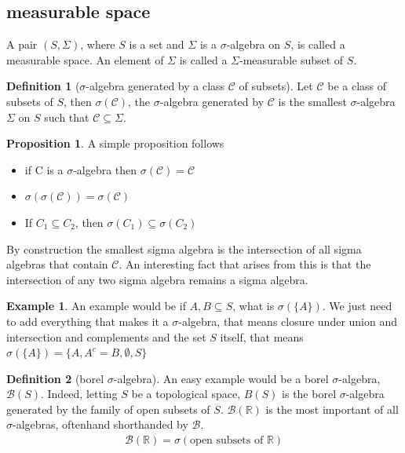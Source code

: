 \documentclass[12pt]{article}
\theoremstyle{definition}
\newtheorem{definition}{Definition}[section]
\newtheorem{proposition}{Proposition}[theorem]
\newtheorem{example}{Example}[section]
\begin{document}
\subsection{measurable space}
A pair $(S, \Sigma)$, where $S$ is a set and $\Sigma$ is a $\sigma$-algebra on $S$, is called a measurable space. An element of $\Sigma$ is called a $\Sigma$-measurable subset of $S$. 
\begin{definition}[$\sigma$-algebra generated by a class $\mathcal{C}$ of subsets]
	Let $\mathcal{C}$ be a class of subsets of $S$, then $\sigma(\mathcal{C})$, the $\sigma$-algebra generated by $\mathcal{C}$ is the smallest $\sigma$-algebra $\Sigma$ on $S$ such that $\mathcal{C} \subseteq \Sigma$. 
	
\end{definition}
\begin{proposition}
	A simple proposition follows 
	\begin{itemize}
		\item if C is a $\sigma$-algebra then $\sigma(\mathcal{C}) = \mathcal{C}$ 
		\item $\sigma(\sigma(\mathcal{C})) = \sigma(\mathcal{C})$
		\item If $C_1 \subseteq C_2$, then $\sigma(C_1) \subseteq \sigma(C_2)$
	\end{itemize}
\end{proposition}
By construction the smallest sigma algebra is the intersection of all sigma algebras that contain $\mathcal{C}$. An interesting fact that arises from this is that the intersection of any two sigma algebra remains a sigma algebra. 
\begin{example}
	An example would be if $A, B \subseteq S$, what is $\sigma(\{A\})$. We just need to add everything that makes it a $\sigma$-algebra, that means closure under union and intersection and complements and the set $S$ itself, that means $\sigma(\{A\}) = \{ A, A^c = B	, \emptyset, S\}$
\end{example}
\begin{definition}[borel $\sigma$-algebra]
	

An easy example would be a borel $\sigma$-algebra, $\mathcal{B}(S)$. Indeed, letting $S$ be a topological space, $B(S)$ is the borel $\sigma$-algebra generated by the family of open subsets of $S$. $\mathcal{B}(\mathbb{R})$ is the most important of all $\sigma$-algebras, oftenhand shorthanded by $\mathcal{B}$.
\begin{align*}
	\mathcal{B}(\mathbb{R}) = \sigma(\text{open subsets of $\mathbb{R}$})
\end{align*}
\end{definition}
\end{document}
